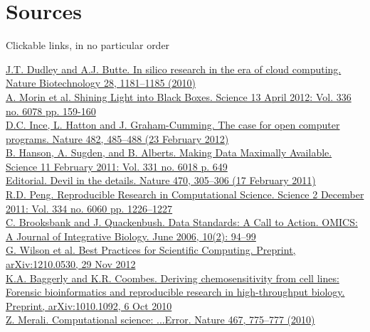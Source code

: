 \documentclass[slidestop]{beamer}
\begin{document}
\section*{Sources}
\extrapagetemplate
\begin{frame}
  Clickable links, in no particular order

  \vspace{0.3cm}

  {\fontsize{3.5}{5}\selectfont
    \href{http://www.nature.com/nbt/journal/v28/n11/full/nbt1110-1181.html}{J.T. Dudley and A.J. Butte. In silico research in the era of cloud computing. Nature Biotechnology 28, 1181--1185 (2010)}\\
    \href{http://www.sciencemag.org/content/336/6078/159.summary}{A. Morin et al. Shining Light into Black Boxes. Science 13 April 2012: Vol. 336 no. 6078 pp. 159-160}\\
    \href{http://www.nature.com/nature/journal/v482/n7386/full/nature10836.html}{D.C. Ince, L. Hatton and J. Graham-Cumming. The case for open computer programs. Nature 482, 485--488 (23 February 2012)}\\
    \href{http://www.sciencemag.org/content/331/6018/649.summary}{B. Hanson, A. Sugden, and B. Alberts. Making Data Maximally Available. Science 11 February 2011: Vol. 331 no. 6018 p. 649}\\
    \href{http://www.nature.com/nature/journal/v470/n7334/full/470305b.html}{Editorial. Devil in the details. Nature 470, 305--306 (17 February 2011)}\\
    \href{http://www.sciencemag.org/content/334/6060/1226.abstract}{R.D. Peng. Reproducible Research in Computational Science. Science 2 December 2011: Vol. 334 no. 6060 pp. 1226--1227}\\
    \href{http://online.liebertpub.com/doi/abs/10.1089/omi.2006.10.94}{C. Brooksbank and J. Quackenbush. Data Standards: A Call to Action. OMICS: A Journal of Integrative Biology. June 2006, 10(2): 94--99}\\
    \href{http://arxiv.org/abs/1210.0530}{G. Wilson et al. Best Practices for Scientific Computing. Preprint, arXiv:1210.0530, 29 Nov 2012}\\
    \href{http://arxiv.org/abs/1010.1092}{K.A. Baggerly and K.R. Coombes. Deriving chemosensitivity from cell lines: Forensic bioinformatics and reproducible research in high-throughput biology. Preprint, arXiv:1010.1092, 6 Oct 2010}\\
    \href{http://www.nature.com/news/2010/101013/full/467775a.html}{Z. Merali. Computational science: ...Error. Nature 467, 775--777 (2010)}\\
}
\end{frame}
\end{document}
